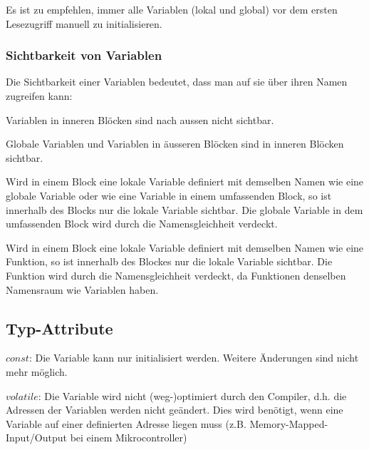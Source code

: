 	Es ist zu empfehlen, immer alle Variablen (lokal und global) vor dem ersten Lesezugriff manuell zu initialisieren.
		
	\subsubsection{Sichtbarkeit von Variablen }
		Die Sichtbarkeit einer Variablen bedeutet, dass man auf sie über ihren Namen zugreifen kann:
		
		\begin{compactitem}
			\item Variablen in inneren Blöcken sind nach aussen nicht sichtbar.
			\item Globale Variablen und Variablen in äusseren Blöcken sind in inneren Blöcken sichtbar.
			\item Wird in einem Block eine lokale Variable definiert mit demselben Namen wie eine globale Variable oder wie eine Variable in einem umfassenden Block, so ist innerhalb des Blocks nur die lokale Variable sichtbar. Die globale Variable in dem umfassenden Block wird durch die Namensgleichheit verdeckt.
			\item Wird in einem Block eine lokale Variable definiert mit demselben Namen wie eine Funktion, so ist innerhalb des Blockes nur die lokale Variable sichtbar. Die Funktion wird durch die Namensgleichheit verdeckt, da Funktionen denselben Namensraum wie Variablen haben.
		\end{compactitem}
			
	\subsection{Typ-Attribute }
		\begin{compactitem}
			\item $const$: Die Variable kann nur initialisiert werden. Weitere Änderungen sind nicht mehr
			möglich.
			
			\item $volatile$: Die Variable wird nicht (weg-)optimiert durch den Compiler, d.h. die Adressen der Variablen werden nicht geändert. Dies wird benötigt, wenn eine Variable auf einer definierten Adresse liegen muss (z.B. Memory-Mapped-Input/Output bei einem Mikrocontroller)
		\end{compactitem}
	
